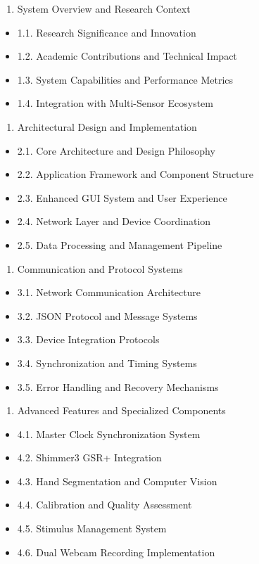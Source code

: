 \documentclass[11pt,a4paper]{article}
\begin{document}
\begin{enumerate}
\item System Overview and Research Context
\end{enumerate}
\begin{itemize}
\item 1.1. Research Significance and Innovation
\item 1.2. Academic Contributions and Technical Impact
\item 1.3. System Capabilities and Performance Metrics
\item 1.4. Integration with Multi-Sensor Ecosystem

\end{itemize}
\begin{enumerate}
\item Architectural Design and Implementation
\end{enumerate}
\begin{itemize}
\item 2.1. Core Architecture and Design Philosophy
\item 2.2. Application Framework and Component Structure
\item 2.3. Enhanced GUI System and User Experience
\item 2.4. Network Layer and Device Coordination
\item 2.5. Data Processing and Management Pipeline

\end{itemize}
\begin{enumerate}
\item Communication and Protocol Systems
\end{enumerate}
\begin{itemize}
\item 3.1. Network Communication Architecture
\item 3.2. JSON Protocol and Message Systems
\item 3.3. Device Integration Protocols
\item 3.4. Synchronization and Timing Systems
\item 3.5. Error Handling and Recovery Mechanisms

\end{itemize}
\begin{enumerate}
\item Advanced Features and Specialized Components
\end{enumerate}
\begin{itemize}
\item 4.1. Master Clock Synchronization System
\item 4.2. Shimmer3 GSR+ Integration
\item 4.3. Hand Segmentation and Computer Vision
\item 4.4. Calibration and Quality Assessment
\item 4.5. Stimulus Management System
\item 4.6. Dual Webcam Recording Implementation

\end{itemize}
\end{document}
